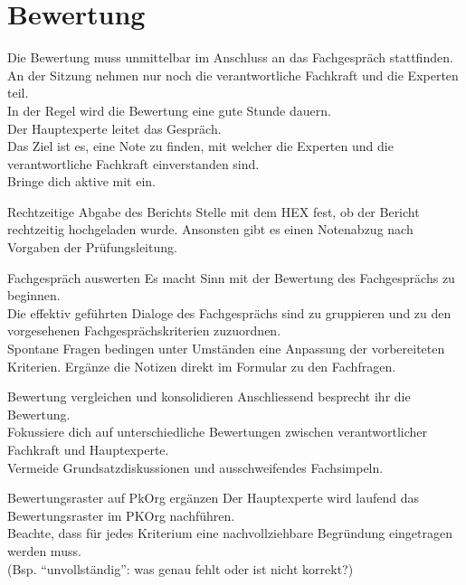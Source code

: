 \section{Bewertung}
Die Bewertung muss unmittelbar im Anschluss an das Fachgespräch stattfinden.\\
An der Sitzung nehmen nur noch die verantwortliche Fachkraft und die Experten teil.\\
In der Regel wird die Bewertung eine gute Stunde dauern.\\
Der Hauptexperte leitet das Gespräch.\\
Das Ziel ist es, eine Note zu finden, mit welcher die Experten und die verantwortliche Fachkraft einverstanden sind.\\
Bringe dich aktive mit ein.
\begin{taskitem}{Rechtzeitige Abgabe des Berichts}
  Stelle mit dem HEX fest, ob der Bericht rechtzeitig hochgeladen wurde. Ansonsten gibt es einen Notenabzug nach Vorgaben der Prüfungsleitung.
\end{taskitem}
\begin{taskitemwithoutcomment}{Fachgespräch auswerten}
  Es macht Sinn mit der Bewertung des Fachgesprächs zu beginnen.\\
  Die effektiv geführten Dialoge des Fachgesprächs sind zu gruppieren und zu den vorgesehenen Fachgesprächskriterien zuzuordnen.\\
  Spontane Fragen bedingen unter Umständen eine Anpassung der vorbereiteten Kriterien.
  Ergänze die Notizen direkt im Formular zu den Fachfragen.
\end{taskitemwithoutcomment}
\begin{taskitemwithoutcomment}{Bewertung vergleichen und konsolidieren}
  Anschliessend besprecht ihr die Bewertung.\\
  Fokussiere dich auf unterschiedliche Bewertungen zwischen verantwortlicher Fachkraft und Hauptexperte.\\
  Vermeide Grundsatzdiskussionen und ausschweifendes Fachsimpeln.
\end{taskitemwithoutcomment}
\begin{taskitemwithoutcomment}{Bewertungsraster auf PkOrg ergänzen}
  Der Hauptexperte wird laufend das Bewertungsraster im PKOrg nachführen.\\
  Beachte, dass für jedes Kriterium eine nachvollziehbare Begründung eingetragen werden muss.\\
  (Bsp. \enquote{unvollständig}: was genau fehlt oder ist nicht korrekt?)\\
\end{taskitemwithoutcomment}
